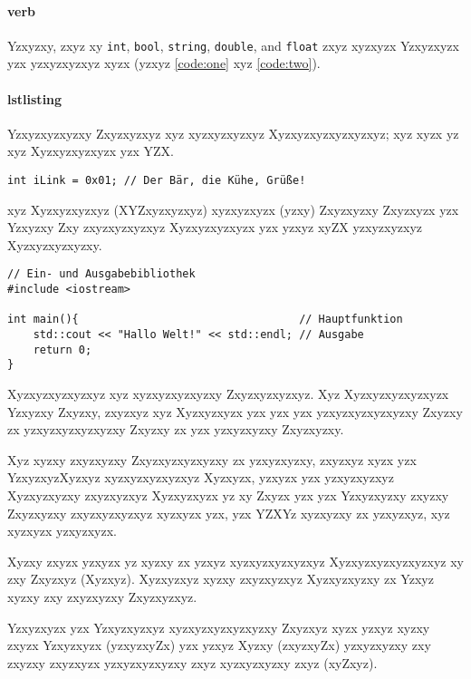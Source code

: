 \paragraph{verb}
Yzxyzxy, zxyz xy \verb|int|, \verb|bool|, \verb|string|, \verb|double|, and \verb|float| zxyz xyzxyzx Yzxyzxyzx yzx yzxyzxyzxyz xyzx (yzxyz \autoref{code:one} xyz \autoref{code:two}).

\paragraph{lstlisting}
Yzxyzxyzxyzxy Zxyzxyzxyz xyz xyzxyzxyzxyz Xyzxyzxyzxyzxyzxyz; xyz xyzx yz xyz Xyzxyzxyzxyzx yzx YZX.

\begin{lstlisting}
int iLink = 0x01; // Der Bär, die Kühe, Grüße!
\end{lstlisting}

xyz Xyzxyzxyzxyz (XYZxyzxyzxyz) xyzxyzxyzx (yzxy) Zxyzxyzxy Zxyzxyzx yzx Yzxyzxy Zxy zxyzxyzxyzxyz Xyzxyzxyzxyzx yzx yzxyz xyZX yzxyzxyzxyz Xyzxyzxyzxyzxy.

\lstset{language=C++}
\begin{lstlisting}[caption={Es ist eine alte Tradition, eine neue Programmiersprache mit einem \code{Hello-World}-Programm einzuweihen. Auch dieses Buch soll mit der Tradition nicht brechen, hier ist das \code{Hello-World}-Programm in C++}, label=code:one]
// Ein- und Ausgabebibliothek
#include <iostream>

int main(){                                  // Hauptfunktion
	std::cout << "Hallo Welt!" << std::endl; // Ausgabe
	return 0;
}
\end{lstlisting}

Xyzxyzxyzxyzxyz xyz xyzxyzxyzxyzxy Zxyzxyzxyzxyz. Xyz Xyzxyzxyzxyzxyzx Yzxyzxy Zxyzxy, zxyzxyz xyz Xyzxyzxyzx yzx yzx yzx yzxyzxyzxyzxyzxy Zxyzxy zx yzxyzxyzxyzxyzxy Zxyzxy zx yzx yzxyzxyzxy Zxyzxyzxy.

Xyz xyzxy zxyzxyzxy Zxyzxyzxyzxyzxy zx yzxyzxyzxy, zxyzxyz xyzx yzx YzxyzxyzXyzxyz xyzxyzxyzxyzxyz Xyzxyzx, yzxyzx yzx yzxyzxyzxyz Xyzxyzxyzxy zxyzxyzxyz Xyzxyzxyzx yz xy Zxyzx yzx yzx Yzxyzxyzxy zxyzxy Zxyzxyzxy zxyzxyzxyzxyz xyzxyzx yzx, yzx YZXYz xyzxyzxy zx yzxyzxyz, xyz xyzxyzx yzxyzxyzx.

Xyzxy zxyzx yzxyzx yz xyzxy zx yzxyz xyzxyzxyzxyzxyz Xyzxyzxyzxyzxyzxyz xy zxy Zxyzxyz (Xyzxyz). Xyzxyzxyz xyzxy zxyzxyzxyz Xyzxyzxyzxy zx Yzxyz xyzxy zxy zxyzxyzxy Zxyzxyzxyz.

Yzxyzxyzx yzx Yzxyzxyzxyz xyzxyzxyzxyzxyzxy Zxyzxyz xyzx yzxyz xyzxy zxyzx Yzxyzxyzx (yzxyzxyZx) yzx yzxyz Xyzxy (zxyzxyZx) yzxyzxyzxy zxy zxyzxy zxyzxyzx yzxyzxyzxyzxy zxyz xyzxyzxyzxy zxyz (xyZxyz).

